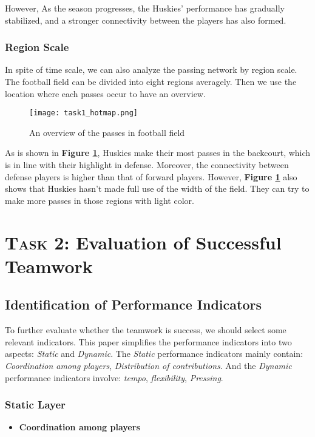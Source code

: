 \documentclass[12pt]{article}  %
\begin{document}
However, As the season progresses, the Huskies' performance has gradually stabilized, and a stronger connectivity between the players has also formed. 


\subsubsection{Region Scale}
In spite of time scale, we can also analyze the passing network by region scale. The football field can be divided into eight regions averagely. Then we use the location where each passes occur to have an overview.
\begin{figure}[htbp]
    \centering
    \texttt{[image: task1\_hotmap.png]} 	%
    \caption{An overview of the passes in football field}		%
    \label{fig:task1_hotmap}							%
\end{figure}

As is shown in \textbf{Figure \ref{fig:task1_hotmap}}, Huskies make their most passes in the backcourt, which is in line with their highlight in defense. Moreover, the connectivity between defense players is higher than that of forward players. However, \textbf{Figure \ref{fig:task1_hotmap}} also shows that Huskies hasn't made full use of the width of the field. They can try to make more passes in those regions with light color. 



\section{\textsc{Task 2: } Evaluation of Successful Teamwork}
\subsection{Identification of Performance Indicators}
To further evaluate whether the teamwork is success, we should select some relevant indicators. This paper simplifies the performance indicators into two aspects: \textit{Static} and \textit{Dynamic}. The \textit{Static} performance indicators mainly contain: \textit{Coordination among players}, \textit{Distribution of contributions}. And the \textit{Dynamic} performance indicators involve: \textit{tempo}, \textit{flexibility}, \textit{Pressing}.

\subsubsection{Static Layer}
\begin{itemize}
    \item \textbf{Coordination among players}
\end{itemize}
\end{document}
